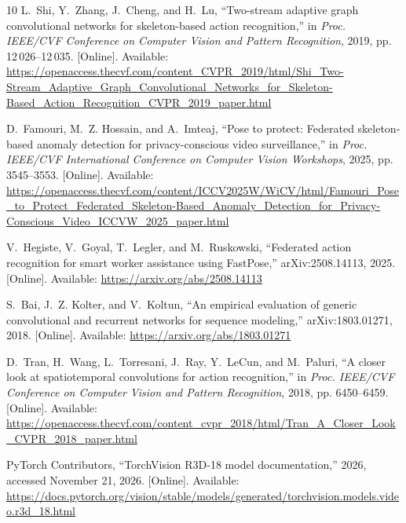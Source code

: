 \documentclass[journal]{IEEEtai}
\begin{document}
\begin{thebibliography}{10}
\BIBentryALTinterwordspacing
L.~Shi, Y.~Zhang, J.~Cheng, and H.~Lu, ``Two-stream adaptive graph
  convolutional networks for skeleton-based action recognition,'' in
  \emph{Proc. IEEE/CVF Conference on Computer Vision and Pattern Recognition},
  2019, pp. 12\,026--12\,035. [Online]. Available:
  \url{https://openaccess.thecvf.com/content_CVPR_2019/html/Shi_Two-Stream_Adaptive_Graph_Convolutional_Networks_for_Skeleton-Based_Action_Recognition_CVPR_2019_paper.html}
\BIBentrySTDinterwordspacing

\BIBentryALTinterwordspacing
D.~Famouri, M.~Z. Hossain, and A.~Imteaj, ``Pose to protect: Federated
  skeleton-based anomaly detection for privacy-conscious video surveillance,''
  in \emph{Proc. IEEE/CVF International Conference on Computer Vision
  Workshops}, 2025, pp. 3545--3553. [Online]. Available:
  \url{https://openaccess.thecvf.com/content/ICCV2025W/WiCV/html/Famouri_Pose_to_Protect_Federated_Skeleton-Based_Anomaly_Detection_for_Privacy-Conscious_Video_ICCVW_2025_paper.html}
\BIBentrySTDinterwordspacing

\BIBentryALTinterwordspacing
V.~Hegiste, V.~Goyal, T.~Legler, and M.~Ruskowski, ``Federated action
  recognition for smart worker assistance using {FastPose},'' arXiv:2508.14113,
  2025. [Online]. Available: \url{https://arxiv.org/abs/2508.14113}
\BIBentrySTDinterwordspacing

\BIBentryALTinterwordspacing
S.~Bai, J.~Z. Kolter, and V.~Koltun, ``An empirical evaluation of generic
  convolutional and recurrent networks for sequence modeling,''
  arXiv:1803.01271, 2018. [Online]. Available:
  \url{https://arxiv.org/abs/1803.01271}
\BIBentrySTDinterwordspacing

\BIBentryALTinterwordspacing
D.~Tran, H.~Wang, L.~Torresani, J.~Ray, Y.~LeCun, and M.~Paluri, ``A closer
  look at spatiotemporal convolutions for action recognition,'' in \emph{Proc.
  IEEE/CVF Conference on Computer Vision and Pattern Recognition}, 2018, pp.
  6450--6459. [Online]. Available:
  \url{https://openaccess.thecvf.com/content_cvpr_2018/html/Tran_A_Closer_Look_CVPR_2018_paper.html}
\BIBentrySTDinterwordspacing

\BIBentryALTinterwordspacing
{PyTorch Contributors}, ``{TorchVision R3D-18} model documentation,'' 2026,
  accessed November 21, 2026. [Online]. Available:
  \url{https://docs.pytorch.org/vision/stable/models/generated/torchvision.models.video.r3d_18.html}
\BIBentrySTDinterwordspacing


\end{thebibliography}
\end{document}
